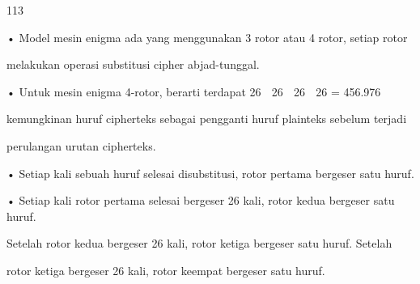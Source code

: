 \documentclass{article}
\begin{document}

113

• Model mesin enigma ada yang menggunakan 3 rotor atau 4 rotor, setiap rotor 

melakukan operasi substitusi cipher abjad-tunggal. 

• Untuk mesin enigma 4-rotor, berarti terdapat 26  26  26  26 = 456.976 

kemungkinan huruf cipherteks sebagai pengganti huruf plainteks sebelum terjadi 

perulangan urutan cipherteks. 

• Setiap kali sebuah huruf selesai disubstitusi, rotor pertama bergeser satu huruf. 

• Setiap kali rotor pertama selesai bergeser 26 kali, rotor kedua bergeser satu huruf. 

Setelah rotor kedua bergeser 26 kali, rotor ketiga bergeser satu huruf. Setelah 

rotor ketiga bergeser 26 kali, rotor keempat bergeser satu huruf.
\end{document}
